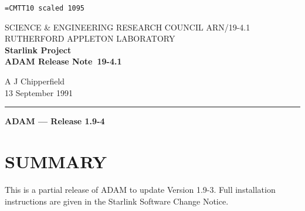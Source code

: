 \pagestyle{myheadings}

\newcommand{\stardoccategory}  {ADAM Release Note}
\newcommand{\stardocinitials}  {ARN}
\newcommand{\stardocnumber}    {19-4.1}
\newcommand{\stardocauthors}   {A J Chipperfield}
\newcommand{\stardocdate}      {13 September 1991}
\newcommand{\stardoctitle}     {ADAM --- Release 1.9-4}

\newcommand{\stardocname}{\stardocinitials /\stardocnumber}
\markright{\stardocname}
\setlength{\textwidth}{160mm}
\setlength{\textheight}{240mm}
\setlength{\topmargin}{-5mm}
\setlength{\oddsidemargin}{0mm}
\setlength{\evensidemargin}{0mm}
\setlength{\parindent}{0mm}
\setlength{\parskip}{\medskipamount}
\setlength{\unitlength}{1mm}


\font\tt=CMTT10 scaled 1095
\renewcommand{\_}{{\tt\char'137}}


\thispagestyle{empty}
SCIENCE \& ENGINEERING RESEARCH COUNCIL \hfill \stardocname\\
RUTHERFORD APPLETON LABORATORY\\
{\large\bf Starlink Project\\}
{\large\bf \stardoccategory\ \stardocnumber}
\begin{flushright}
\stardocauthors\\
\stardocdate
\end{flushright}
\vspace{-4mm}
\rule{\textwidth}{0.5mm}
\vspace{5mm}
\begin{center}
{\Large\bf \stardoctitle}
\end{center}
\vspace{5mm}

\section{SUMMARY}
This is a partial release of ADAM to update Version 1.9-3.
Full installation instructions are given in the Starlink Software
Change Notice.

